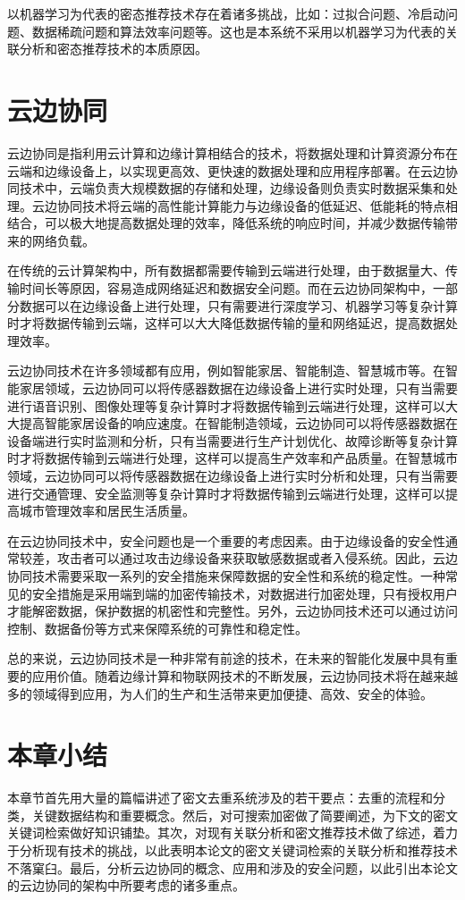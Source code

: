 \documentclass[promaster]{thesis-uestc}
\begin{document}
以机器学习为代表的密态推荐技术存在着诸多挑战，比如：过拟合问题、冷启动问题、数据稀疏问题和算法效率问题等。这也是本系统不采用以机器学习为代表的关联分析和密态推荐技术的本质原因。
\section{云边协同}
云边协同是指利用云计算和边缘计算相结合的技术，将数据处理和计算资源分布在云端和边缘设备上，以实现更高效、更快速的数据处理和应用程序部署。在云边协同技术中，云端负责大规模数据的存储和处理，边缘设备则负责实时数据采集和处理。云边协同技术将云端的高性能计算能力与边缘设备的低延迟、低能耗的特点相结合，可以极大地提高数据处理的效率，降低系统的响应时间，并减少数据传输带来的网络负载。

在传统的云计算架构中，所有数据都需要传输到云端进行处理，由于数据量大、传输时间长等原因，容易造成网络延迟和数据安全问题。而在云边协同架构中，一部分数据可以在边缘设备上进行处理，只有需要进行深度学习、机器学习等复杂计算时才将数据传输到云端，这样可以大大降低数据传输的量和网络延迟，提高数据处理效率。

云边协同技术在许多领域都有应用，例如智能家居、智能制造、智慧城市等。在智能家居领域，云边协同可以将传感器数据在边缘设备上进行实时处理，只有当需要进行语音识别、图像处理等复杂计算时才将数据传输到云端进行处理，这样可以大大提高智能家居设备的响应速度。在智能制造领域，云边协同可以将传感器数据在设备端进行实时监测和分析，只有当需要进行生产计划优化、故障诊断等复杂计算时才将数据传输到云端进行处理，这样可以提高生产效率和产品质量。在智慧城市领域，云边协同可以将传感器数据在边缘设备上进行实时分析和处理，只有当需要进行交通管理、安全监测等复杂计算时才将数据传输到云端进行处理，这样可以提高城市管理效率和居民生活质量。

在云边协同技术中，安全问题也是一个重要的考虑因素。由于边缘设备的安全性通常较差，攻击者可以通过攻击边缘设备来获取敏感数据或者入侵系统。因此，云边协同技术需要采取一系列的安全措施来保障数据的安全性和系统的稳定性。一种常见的安全措施是采用端到端的加密传输技术，对数据进行加密处理，只有授权用户才能解密数据，保护数据的机密性和完整性。另外，云边协同技术还可以通过访问控制、数据备份等方式来保障系统的可靠性和稳定性。

总的来说，云边协同技术是一种非常有前途的技术，在未来的智能化发展中具有重要的应用价值。随着边缘计算和物联网技术的不断发展，云边协同技术将在越来越多的领域得到应用，为人们的生产和生活带来更加便捷、高效、安全的体验。
\section{本章小结}
本章节首先用大量的篇幅讲述了密文去重系统涉及的若干要点：去重的流程和分类，关键数据结构和重要概念。然后，对可搜索加密做了简要阐述，为下文的密文关键词检索做好知识铺垫。其次，对现有关联分析和密文推荐技术做了综述，着力于分析现有技术的挑战，以此表明本论文的密文关键词检索的关联分析和推荐技术不落窠臼。最后，分析云边协同的概念、应用和涉及的安全问题，以此引出本论文的云边协同的架构中所要考虑的诸多重点。
\end{document}
